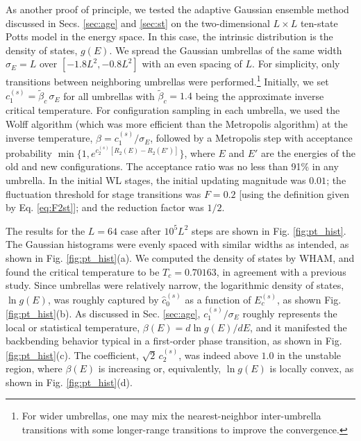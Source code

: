 \documentclass[reprint, superscriptaddress, floatfix]{revtex4-1}
\newcommand{\note}[1]{{\color{DarkGreen}\footnotesize \textsc{Note.} #1}}
\begin{document}
As another proof of principle,
we tested the adaptive Gaussian ensemble method
discussed in Secs. \ref{sec:age} and \ref{sec:st}
on the two-dimensional $L\times L$ ten-state
Potts model\cite{wu1982, newman, wang2001, wang2001pre}
in the energy space.
%
In this case, %
the intrinsic distribution is
the density of states, $g(E)$.
%
We spread the Gaussian umbrellas
of the same width $\sigma_E = L$ over $[-1.8L^2, -0.8L^2]$
with an even spacing of $L$.
%
For simplicity, only transitions between neighboring
umbrellas were performed.\footnote{For
  wider umbrellas,
  one may mix the nearest-neighbor inter-umbrella transitions
  with some longer-range transitions
  to improve the convergence.}
%
%
Initially, we set
$c_1^{(s)} = \tilde \beta_c \, \sigma_E$
for all umbrellas
with $\tilde \beta_c = 1.4$
being the approximate inverse critical temperature.
%
For configuration sampling in each umbrella,
we used the Wolff algorithm\cite{wolff1989, newman}
(which was more efficient than the Metropolis algorithm)
at the inverse temperature, $\beta = c_1^{(s)}/\sigma_E$,
followed by a Metropolis step with
acceptance probability
$\min\bigl\{1, e^{c_2^{(s)} [R_2(E) - R_2(E')]} \bigr\}$,
where $E$ and $E'$ are the energies of the old and new configurations.
%
The acceptance ratio was no less than 91\% in any umbrella.
%
In the initial WL stages,
the initial updating magnitude was $0.01$;
the fluctuation threshold for stage transitions
was $F = 0.2$ [using the definition given by Eq. \eqref{eq:F2st}];
and the reduction factor was $1/2$.

The results for the $L = 64$ case
after $10^5 L^2$ steps are shown
in Fig. \ref{fig:pt_hist}.
%
The Gaussian histograms were evenly spaced with similar widths as intended,
as shown in Fig. \ref{fig:pt_hist}(a).
%
We computed the density of states by WHAM,
and found the critical temperature to be $T_c = 0.70163$,
in agreement with a previous study\cite{wang2001pre}.
%
Since umbrellas were relatively narrow,
the logarithmic density of states, $\ln g(E)$,
was roughly captured
by $\hat c_0^{(s)}$ as a function of $E_c^{(s)}$,
as shown Fig. \ref{fig:pt_hist}(b).
%
As discussed in Sec. \ref{sec:age},
$c_1^{(s)}/\sigma_E$ roughly represents
the local or statistical temperature, $\beta(E) = d\ln g(E)/dE$,
and it manifested
the backbending behavior\cite{kim2006, *kim2007, kim2010}
typical in a first-order phase transition,
as shown in Fig. \ref{fig:pt_hist}(c).
%
The coefficient, $\sqrt 2 \, c_2^{(s)}$,
was indeed above $1.0$
in the unstable region,
where $\beta(E)$ is increasing or, equivalently,
$\ln g(E)$ is locally convex,
as shown in Fig. \ref{fig:pt_hist}(d).
\end{document}
